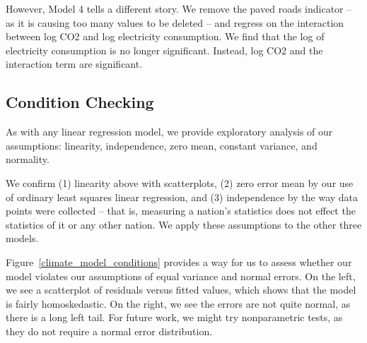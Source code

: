 \documentclass[12pt]{article}
\begin{document}
However, Model 4 tells a different story.
We remove the paved roads indicator -- as it is causing too many values to be deleted -- and regress on the interaction between log CO2 and log electricity consumption.
We find that the log of electricity consumption is no longer significant.
Instead, log CO2 and the interaction term are significant.

\subsection{Condition Checking}
As with any linear regression model, we provide exploratory analysis of our assumptions: linearity, independence, zero mean, constant variance, and normality.

We confirm (1) linearity above with scatterplots, (2) zero error mean by our use of ordinary least squares linear regression, and (3) independence by the way data points were collected -- that is, measuring a nation's statistics does not effect the statistics of it or any other nation. We apply these assumptions to the other three models.

Figure~\ref{climate_model_conditions} provides a way for us to assess whether our model violates our assumptions of equal variance and normal errors. On the left, we see a scatterplot of residuals versus fitted values, which shows that the model is fairly homoskedastic. On the right, we see the errors are not quite normal, as there is a long left tail. For future work, we might try nonparametric tests, as they do not require a normal error distribution.
\end{document}
